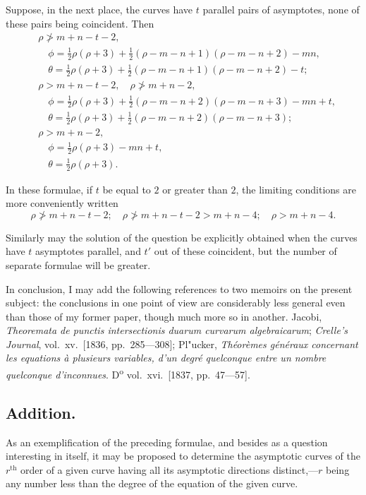 \documentclass[11pt,a4paper]{article}
\theoremstyle{plain}
\theoremstyle{definition}
\theoremstyle{remark}
\begin{document}
Suppose, in the next place, the curves have $t$ parallel pairs of asymptotes, none of
these pairs being coincident. Then
\begin{align*}
&\rho \not> m+n-t-2, \\
&\quad \phi = \tfrac{1}{2}\rho(\rho+3) + \tfrac{1}{2}(\rho-m-n+1)(\rho-m-n+2) - mn, \\
&\quad \theta = \tfrac{1}{2}\rho(\rho+3) + \tfrac{1}{2}(\rho-m-n+1)(\rho-m-n+2) - t;\\[6pt]
&\rho > m+n-t-2, \quad \rho \not> m+n-2, \\
&\quad \phi = \tfrac{1}{2}\rho(\rho+3) + \tfrac{1}{2}(\rho-m-n+2)(\rho-m-n+3) - mn + t, \\
&\quad \theta = \tfrac{1}{2}\rho(\rho+3) + \tfrac{1}{2}(\rho-m-n+2)(\rho-m-n+3);\\[6pt]
&\rho > m+n-2, \\
&\quad \phi = \tfrac{1}{2}\rho(\rho+3) - mn + t, \\
&\quad \theta = \tfrac{1}{2}\rho(\rho+3).
\end{align*}

In these formulae, if $t$ be equal to $2$ or greater than $2$, the limiting conditions are
more conveniently written
\[
\rho \not> m+n-t-2; \quad \rho \not> m+n-t-2 > m+n-4; \quad \rho > m+n-4.
\]

Similarly may the solution of the question be explicitly obtained when the curves
have $t$ asymptotes parallel, and $t'$ out of these coincident, but the number of separate
formulae will be greater.

In conclusion, I may add the following references to two memoirs on the present
subject: the conclusions in one point of view are considerably less general even than
those of my former paper, though much more so in another. Jacobi, \textit{Theoremata de
punctis intersectionis duarum curvarum algebraicarum}; \textit{Crelle's Journal}, vol.~xv.\ [1836,
pp.~285---308]; Pl"{u}cker, \textit{Th\'{e}or\`{e}mes g\'{e}n\'{e}raux concernant les equations \`{a} plusieurs variables,
d'un degr\'{e} quelconque entre un nombre quelconque d'inconnues}. D\textsuperscript{o} vol.~xvi.\ [1837,
pp.~47---57].

\newpage
\subsection*{Addition.}

As an exemplification of the preceding formulae, and besides as a question interesting
in itself, it may be proposed to determine the asymptotic curves of the $r^{\text{th}}$ order of
a given curve having all its asymptotic directions distinct,---$r$ being any number less
than the degree of the equation of the given curve.
\end{document}
